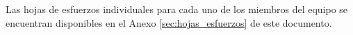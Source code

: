 Las hojas de esfuerzos individuales para cada uno de los miembros del equipo se encuentran disponibles en el Anexo \ref{sec:hojas_esfuerzos} de este documento.